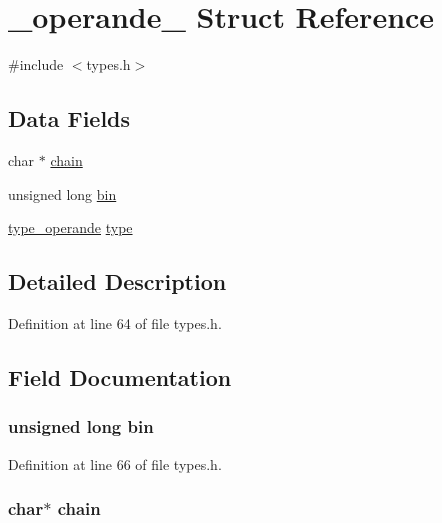 \hypertarget{struct__operande__}{\section{\-\_\-operande\-\_\- Struct Reference}
\label{struct__operande__}
}


{\ttfamily \#include $<$types.\-h$>$}

\subsection*{Data Fields}
\begin{DoxyCompactItemize}
\item 
char $\ast$ \hyperlink{struct__operande___a1a2e600921a838625caf6c28eb97240c}{chain}
\item 
unsigned long \hyperlink{struct__operande___a025145d9c0f048eea54373b3ff382480}{bin}
\item 
\hyperlink{types_8h_a2aa311b42a84b9be6f28ba4705923692}{type\-\_\-operande} \hyperlink{struct__operande___a8c1cd31c6332f0be08cd6d98ebc22353}{type}
\end{DoxyCompactItemize}


\subsection{Detailed Description}


Definition at line 64 of file types.\-h.



\subsection{Field Documentation}
\hypertarget{struct__operande___a025145d9c0f048eea54373b3ff382480}{
\subsubsection[{bin}]{\setlength{\rightskip}{0pt plus 5cm}unsigned long bin}}\label{struct__operande___a025145d9c0f048eea54373b3ff382480}


Definition at line 66 of file types.\-h.

\hypertarget{struct__operande___a1a2e600921a838625caf6c28eb97240c}{
\subsubsection[{chain}]{\setlength{\rightskip}{0pt plus 5cm}char$\ast$ chain}}\label{struct__operande___a1a2e600921a838625caf6c28eb97240c}


